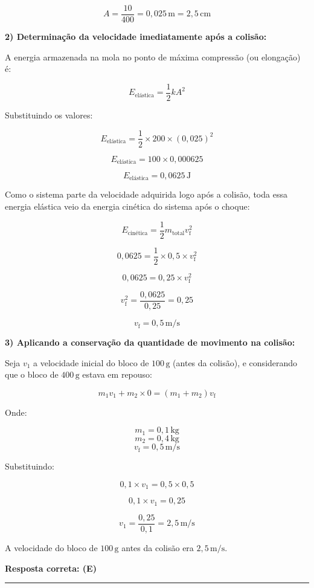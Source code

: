 \documentclass[a4paper,12pt]{article}
\begin{document}
\begin{flushleft}
\[
A = \frac{10}{400} = 0,025\,\mathrm{m} = 2,5\,\mathrm{cm}
\]

\textbf{2) Determinação da velocidade imediatamente após a colisão:}

A energia armazenada na mola no ponto de máxima compressão (ou elongação) é:

\[
E_{\text{elástica}} = \frac{1}{2}kA^2
\]

Substituindo os valores:

\[
E_{\text{elástica}} = \frac{1}{2} \times 200 \times (0,025)^2
\]

\[
E_{\text{elástica}} = 100 \times 0,000625
\]

\[
E_{\text{elástica}} = 0,0625\,\mathrm{J}
\]

Como o sistema parte da velocidade adquirida logo após a colisão, toda essa energia elástica veio da energia cinética do sistema após o choque:

\[
E_{\text{cinética}} = \frac{1}{2} m_{\text{total}} v_{\text{f}}^2
\]

\[
0,0625 = \frac{1}{2} \times 0,5 \times v_{\text{f}}^2
\]

\[
0,0625 = 0,25 \times v_{\text{f}}^2
\]

\[
v_{\text{f}}^2 = \frac{0,0625}{0,25} = 0,25
\]

\[
v_{\text{f}} = 0,5\,\mathrm{m/s}
\]

\textbf{3) Aplicando a conservação da quantidade de movimento na colisão:}

Seja $v_1$ a velocidade inicial do bloco de $100\,\mathrm{g}$ (antes da colisão), e considerando que o bloco de $400\,\mathrm{g}$ estava em repouso:

\[
m_1 v_1 + m_2 \times 0 = (m_1 + m_2) v_{\text{f}}
\]

Onde:

\[
m_1 = 0,1\,\mathrm{kg}
\]
\[
m_2 = 0,4\,\mathrm{kg}
\]
\[
v_{\text{f}} = 0,5\,\mathrm{m/s}
\]

Substituindo:

\[
0,1 \times v_1 = 0,5 \times 0,5
\]

\[
0,1 \times v_1 = 0,25
\]

\[
v_1 = \frac{0,25}{0,1} = 2,5\,\mathrm{m/s}
\]

A velocidade do bloco de $100\,\mathrm{g}$ antes da colisão era $2,5\,\mathrm{m/s}$.

\textbf{Resposta correta: \colorbox{green!50}{(E)}}

\end{flushleft}
\noindent\rule{\linewidth}{0.6pt}\\
\end{document}
